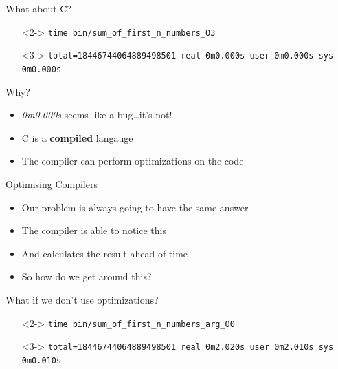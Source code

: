 \documentclass[12pt, aspectration=169]{beamer}
\begin{document}
    \begin{frame}{What about C?}
        \begin{itemize}
            \item[]<2-> \texttt{time bin/sum\_of\_first\_n\_numbers\_O3\newline}
            \item[]<3-> \texttt{total=18446744064889498501\newline
            real 0m0.000s\newline
            user 0m0.000s\newline
            sys 0m0.000s\newline}
        \end{itemize}
    \end{frame}

    \begin{frame}{Why?}
        \begin{itemize}
            \item \textit{0m0.000s} seems like a bug\ldots it's not!
            \item C is a \textbf{compiled} langauge
            \item The compiler can perform optimizations on the code
        \end{itemize}
    \end{frame}

    \begin{frame}{Optimising Compilers}
        \begin{itemize}
            \item Our problem is always going to have the same answer
            \item The compiler is able to notice this
            \item And calculates the result ahead of time
            \item So how do we get around this?
        \end{itemize}
    \end{frame}

    \begin{frame}{What if we don't use optimizations?}
        \begin{itemize}
            \item[]<2-> \texttt{time bin/sum\_of\_first\_n\_numbers\_arg\_O0\newline}
            \item[]<3-> \texttt{total=18446744064889498501\newline
            real 0m2.020s\newline
            user 0m2.010s\newline
            sys 0m0.010s\newline}
        \end{itemize}
    \end{frame}
\end{document}
